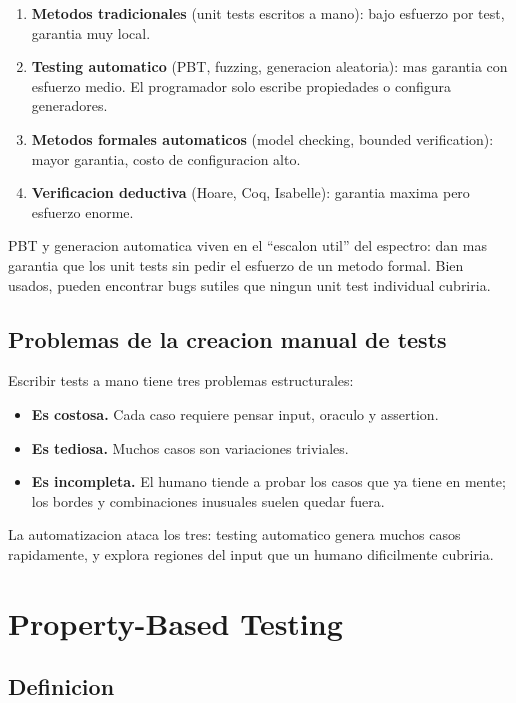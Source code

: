 \documentclass[12pt,a4paper]{article}
\begin{document}
\begin{enumerate}
  \item \textbf{Metodos tradicionales} (unit tests escritos a mano): bajo esfuerzo por test,
  garantia muy local.
  \item \textbf{Testing automatico} (PBT, fuzzing, generacion aleatoria): mas garantia con
  esfuerzo medio. El programador solo escribe propiedades o configura generadores.
  \item \textbf{Metodos formales automaticos} (model checking, bounded verification): mayor
  garantia, costo de configuracion alto.
  \item \textbf{Verificacion deductiva} (Hoare, Coq, Isabelle): garantia maxima pero esfuerzo
  enorme.
\end{enumerate}

\begin{ideabox}
PBT y generacion automatica viven en el ``escalon util'' del espectro: dan mas garantia que
los unit tests sin pedir el esfuerzo de un metodo formal. Bien usados, pueden encontrar bugs
sutiles que ningun unit test individual cubriria.
\end{ideabox}

\subsection{Problemas de la creacion manual de tests}

Escribir tests a mano tiene tres problemas estructurales:

\begin{itemize}
  \item \textbf{Es costosa.} Cada caso requiere pensar input, oraculo y assertion.
  \item \textbf{Es tediosa.} Muchos casos son variaciones triviales.
  \item \textbf{Es incompleta.} El humano tiende a probar los casos que ya tiene en mente; los
  bordes y combinaciones inusuales suelen quedar fuera.
\end{itemize}

La automatizacion ataca los tres: testing automatico genera muchos casos rapidamente, y
explora regiones del input que un humano dificilmente cubriria.

\section{Property-Based Testing}

\subsection{Definicion}
\end{document}
